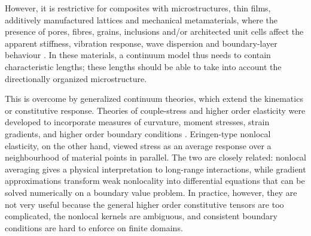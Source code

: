 \documentclass[final,3p,times,fleqn]{elsarticle}
\begin{document}
However, it is restrictive for composites with microstructures, thin films, additively manufactured lattices and mechanical metamaterials, where the presence of pores, fibres, grains, inclusions and/or architected unit cells affect the apparent stiffness, vibration response, wave dispersion and boundary-layer behaviour \cite{Jiao2023,Sarar2024}. In these materials, a continuum model thus needs to contain characteristic lengths; these lengths should be able to take into account the directionally organized microstructure.


This is overcome by generalized continuum theories, which extend the kinematics or constitutive response. Theories of couple-stress and higher order elasticity were developed to incorporate measures of curvature, moment stresses, strain gradients, and higher order boundary conditions \cite{Toupin1962,MindlinTiersten1962,Mindlin1964,Mindlin1965}. Eringen-type nonlocal elasticity, on the other hand, viewed stress as an average response over a neighbourhood of material points \cite{EringenEdelen1972,Eringen1972Polar,Eringen1983} in parallel. The two are closely related: nonlocal averaging gives a physical interpretation to long-range interactions, while gradient approximations transform weak nonlocality into differential equations that can be solved numerically on a boundary value problem. In practice, however, they are not very useful because the general higher order constitutive tensors are too complicated, the nonlocal kernels are ambiguous, and consistent boundary conditions are hard to enforce on finite domains.





\end{document}

